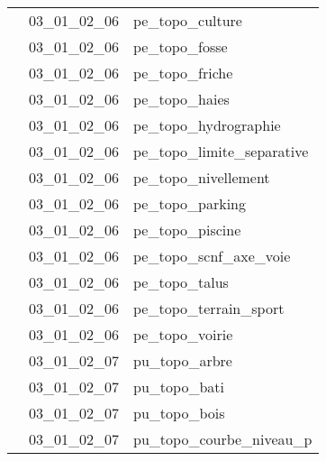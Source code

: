 \documentclass[12pt,titlepage]{book}
\begin{document}
\begin{supertabular}{|p{10cm}|c|p{15cm}|}
                    & 03\_01\_02\_06 & pe\_topo\_culture\\


                    & 03\_01\_02\_06 & pe\_topo\_fosse\\


                    & 03\_01\_02\_06 & pe\_topo\_friche\\


                    & 03\_01\_02\_06 & pe\_topo\_haies\\


                    & 03\_01\_02\_06 & pe\_topo\_hydrographie\\


                    & 03\_01\_02\_06 & pe\_topo\_limite\_separative\\


                    & 03\_01\_02\_06 & pe\_topo\_nivellement\\


                    & 03\_01\_02\_06 & pe\_topo\_parking\\


                    & 03\_01\_02\_06 & pe\_topo\_piscine\\


                    & 03\_01\_02\_06 & pe\_topo\_scnf\_axe\_voie\\


                    & 03\_01\_02\_06 & pe\_topo\_talus\\


                    & 03\_01\_02\_06 & pe\_topo\_terrain\_sport\\


                    & 03\_01\_02\_06 & pe\_topo\_voirie\\


                    & 03\_01\_02\_07 & pu\_topo\_arbre\\


                    & 03\_01\_02\_07 & pu\_topo\_bati\\


                    & 03\_01\_02\_07 & pu\_topo\_bois\\


                    & 03\_01\_02\_07 & pu\_topo\_courbe\_niveau\_p\\



\end{supertabular}
\end{document}

